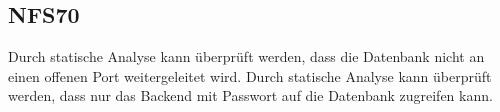 \subsection*{NFS70}

Durch statische Analyse kann überprüft werden, dass die Datenbank nicht an einen offenen Port weitergeleitet wird.
Durch statische Analyse kann überprüft werden, dass nur das Backend mit Passwort auf die Datenbank zugreifen kann.
